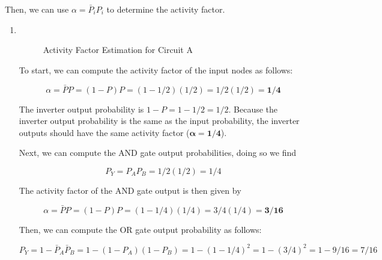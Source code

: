 \documentclass[fleqn]{article}
\begin{document}
\begin{enumerate}
		Then, we can use $\alpha = \bar{P}_iP_i$ to determine the activity factor.
		\pagebreak
		\begin{enumerate}
			\item ~
			
			\begin{figure}[H]				
				\centerline{}
				\caption{Activity Factor Estimation for Circuit A}
				\label{fig::activity_factor_a}
			\end{figure}
			
			To start, we can compute the activity factor of the input nodes as follows:
			
			\begin{equation*}
				\alpha = \bar{P}P = (1 - P)P = (1 - 1/2)(1/2) = 1/2(1/2) = \mathbf{1/4}
			\end{equation*}
			
			The inverter output probability is $1 - P = 1 - 1/2 = 1/2$. Because the inverter output probability is the same as the input probability, the inverter outputs should have the same activity factor ($\mathbf{\alpha = 1/4}$).
			
			Next, we can compute the AND gate output probabilities, doing so we find
			
			\begin{equation*}
				P_Y = P_AP_B = 1/2(1/2) = 1/4
			\end{equation*}
			
			The activity factor of the AND gate output is then given by
			
			\begin{equation*}
				\alpha = \bar{P}P = (1 - P)P = (1 - 1/4)(1/4) = 3/4(1/4) = \mathbf{3/16}
			\end{equation*}
			
			Then, we can compute the OR gate output probability as follows:
			
			\begin{equation*}
				P_Y = 1 - \bar{P}_A\bar{P}_B = 1 - (1 - P_A)(1 - P_B) = 1 - (1 - 1/4)^2 = 1 - (3/4)^2 = 1 - 9/16 = 7/16
			\end{equation*}
			

\end{enumerate}
\end{enumerate}
\end{document}
